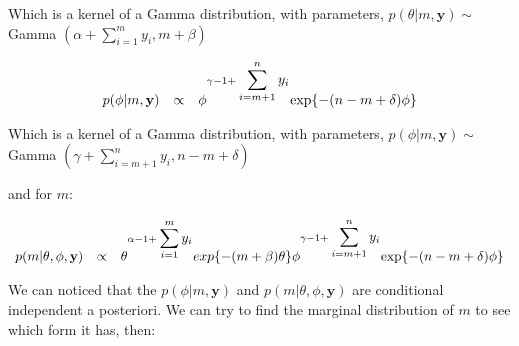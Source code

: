 \documentclass{article}
\begin{document}
Which is a kernel of a Gamma distribution, with parameters,
$p(\theta | m,\textbf{y}) \sim $Gamma $\left(\alpha + \displaystyle\sum_{i=1}^{m}{y_i}, m + \beta \right)$

\begin{equation*}
\begin{array}{lcl ll }

p(\phi | m,\textbf{y}) & \propto & \phi^{\gamma -1 + \displaystyle\sum_{i=m+1}^{n}y_i}\mbox{exp}\{-(n-m + \delta)\phi\} \\ 

 \end{array}
\end{equation*}

Which is a kernel of a Gamma distribution, with parameters,
$p(\phi | m,\textbf{y}) \sim $Gamma $\left(\gamma + \displaystyle\sum_{i=m+1}^{n}y_i, n - m + \delta \right)$

and for $m$:

\begin{equation*}
\begin{array}{lcl ll }
p(m|\theta, \phi,\textbf{y}) & \propto & \theta^{\alpha -1 + \displaystyle\sum_{i=1}^{m}{y_i}}exp\{-(m + \beta)\theta\}\phi^{\gamma -1 + \displaystyle\sum_{i=m+1}^{n}y_i}\mbox{exp}\{-(n-m + \delta)\phi\} \\ 
 \end{array}
\end{equation*}

We can noticed that the $p(\phi | m,\textbf{y})$ and $p(m|\theta, \phi,\textbf{y})$ are conditional independent a posteriori. We can try to find the marginal distribution of $m$ to see which form it has, then:
\end{document}
